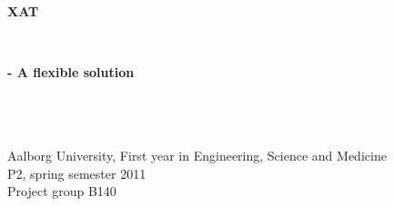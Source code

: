 \thispagestyle{empty}
\begin{center}
	\hrulefill\newline
	\\
	\begin{LARGE}	
	\textbf{XAT}
	\end{LARGE}
	\\
	\begin{large} 
	\textbf{- A flexible solution}
	\end{large}\\
	\hrulefill\newline
	\\~\\
	Aalborg University, First year in Engineering, Science and Medicine\\
	P2, spring semester 2011	\\
	Project group B140\\
\end{center}